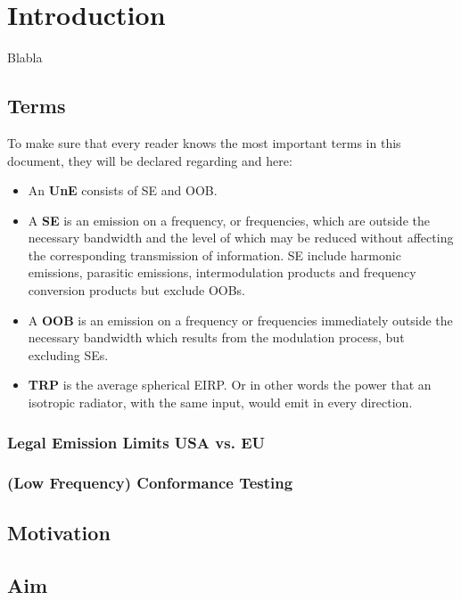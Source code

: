 \chapter{Introduction}

Blabla \cite{2018arXiv180310993F} \cite{keysightota} \cite{inproceedings} \cite{6375745} \cite{balanis} \cite{19510} \cite{1446714} \\

\section{Terms}

To make sure that every reader knows the most important terms in this document, they will be declared regarding \cite{seitur} and \cite{ctiaat} here:

\begin{itemize}
\item An \textbf{\acf{UnE}} consists of \acl{SE} and \acl{OOB}.
\item A \textbf{\acf{SE}} is an emission on a frequency, or frequencies, which are outside the necessary bandwidth and the level of which may be reduced without affecting the corresponding transmission of information. \acl{SE} include harmonic
emissions, parasitic emissions, intermodulation products and frequency conversion products but exclude \aclp{OOB}.
\item A \textbf{\acf{OOB}} is an emission on a frequency or frequencies immediately outside the necessary bandwidth which results from the modulation process, but excluding \aclp{SE}.
\item \textbf{\acf{TRP}} is the average spherical \ac{EIRP}. Or in other words the power that an isotropic radiator, with the same input, would emit in every direction.
\end{itemize}

\subsection{Legal Emission Limits USA vs. EU}

\subsection{(Low Frequency) Conformance Testing}

\section{Motivation}

\section{Aim}